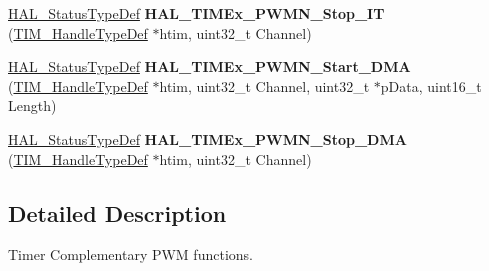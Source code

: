 \begin{DoxyCompactItemize}
\mbox{\hyperlink{stm32f7xx__hal__def_8h_a63c0679d1cb8b8c684fbb0632743478f}{H\+A\+L\+\_\+\+Status\+Type\+Def}} {\bfseries H\+A\+L\+\_\+\+T\+I\+M\+Ex\+\_\+\+P\+W\+M\+N\+\_\+\+Stop\+\_\+\+IT} (\mbox{\hyperlink{struct_t_i_m___handle_type_def}{T\+I\+M\+\_\+\+Handle\+Type\+Def}} $\ast$htim, uint32\+\_\+t Channel)
\item 
\mbox{\label{group___t_i_m_ex___exported___functions___group3_gac525533dc108ee4915ca93d5a43cb3b5}} 
\mbox{\hyperlink{stm32f7xx__hal__def_8h_a63c0679d1cb8b8c684fbb0632743478f}{H\+A\+L\+\_\+\+Status\+Type\+Def}} {\bfseries H\+A\+L\+\_\+\+T\+I\+M\+Ex\+\_\+\+P\+W\+M\+N\+\_\+\+Start\+\_\+\+D\+MA} (\mbox{\hyperlink{struct_t_i_m___handle_type_def}{T\+I\+M\+\_\+\+Handle\+Type\+Def}} $\ast$htim, uint32\+\_\+t Channel, uint32\+\_\+t $\ast$p\+Data, uint16\+\_\+t Length)
\item 
\mbox{\label{group___t_i_m_ex___exported___functions___group3_ga10afdfdc5eed2e0288ccb969f48bc0e4}} 
\mbox{\hyperlink{stm32f7xx__hal__def_8h_a63c0679d1cb8b8c684fbb0632743478f}{H\+A\+L\+\_\+\+Status\+Type\+Def}} {\bfseries H\+A\+L\+\_\+\+T\+I\+M\+Ex\+\_\+\+P\+W\+M\+N\+\_\+\+Stop\+\_\+\+D\+MA} (\mbox{\hyperlink{struct_t_i_m___handle_type_def}{T\+I\+M\+\_\+\+Handle\+Type\+Def}} $\ast$htim, uint32\+\_\+t Channel)
\end{DoxyCompactItemize}


\subsection{Detailed Description}
Timer Complementary P\+WM functions. 

